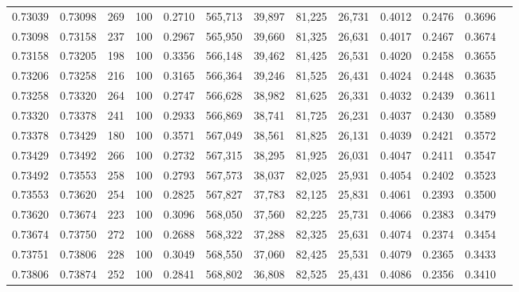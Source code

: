 \begin{tabular}{rrrrrrrrrrrrr}
0.73039 & 0.73098 &   269 & 100 &                                     0.2710 & 565,713 &  39,897 &  81,225 &  26,731 & 0.4012 & 0.2476 & 0.3696 \\
0.73098 & 0.73158 &   237 & 100 &                                     0.2967 & 565,950 &  39,660 &  81,325 &  26,631 & 0.4017 & 0.2467 & 0.3674 \\
0.73158 & 0.73205 &   198 & 100 &                                     0.3356 & 566,148 &  39,462 &  81,425 &  26,531 & 0.4020 & 0.2458 & 0.3655 \\
0.73206 & 0.73258 &   216 & 100 &                                     0.3165 & 566,364 &  39,246 &  81,525 &  26,431 & 0.4024 & 0.2448 & 0.3635 \\
0.73258 & 0.73320 &   264 & 100 &                                     0.2747 & 566,628 &  38,982 &  81,625 &  26,331 & 0.4032 & 0.2439 & 0.3611 \\
0.73320 & 0.73378 &   241 & 100 &                                     0.2933 & 566,869 &  38,741 &  81,725 &  26,231 & 0.4037 & 0.2430 & 0.3589 \\
0.73378 & 0.73429 &   180 & 100 &                                     0.3571 & 567,049 &  38,561 &  81,825 &  26,131 & 0.4039 & 0.2421 & 0.3572 \\
0.73429 & 0.73492 &   266 & 100 &                                     0.2732 & 567,315 &  38,295 &  81,925 &  26,031 & 0.4047 & 0.2411 & 0.3547 \\
0.73492 & 0.73553 &   258 & 100 &                                     0.2793 & 567,573 &  38,037 &  82,025 &  25,931 & 0.4054 & 0.2402 & 0.3523 \\
0.73553 & 0.73620 &   254 & 100 &                                     0.2825 & 567,827 &  37,783 &  82,125 &  25,831 & 0.4061 & 0.2393 & 0.3500 \\
0.73620 & 0.73674 &   223 & 100 &                                     0.3096 & 568,050 &  37,560 &  82,225 &  25,731 & 0.4066 & 0.2383 & 0.3479 \\
0.73674 & 0.73750 &   272 & 100 &                                     0.2688 & 568,322 &  37,288 &  82,325 &  25,631 & 0.4074 & 0.2374 & 0.3454 \\
0.73751 & 0.73806 &   228 & 100 &                                     0.3049 & 568,550 &  37,060 &  82,425 &  25,531 & 0.4079 & 0.2365 & 0.3433 \\
0.73806 & 0.73874 &   252 & 100 &                                     0.2841 & 568,802 &  36,808 &  82,525 &  25,431 & 0.4086 & 0.2356 & 0.3410 \\

\end{tabular}
